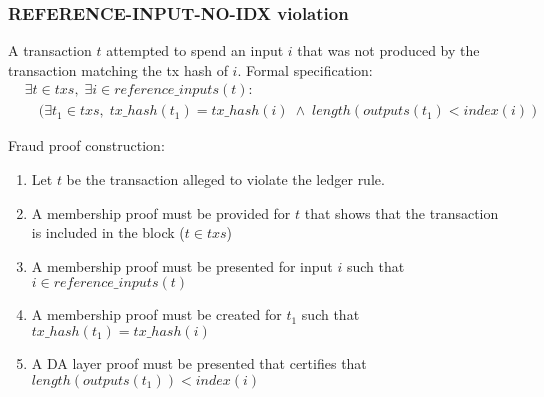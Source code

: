 \documentclass[../midgard.tex]{subfiles}
\begin{document}
\subsubsection{REFERENCE-INPUT-NO-IDX violation}
\label{violation:REFERENCE-INPUT-NO-IDX}
A transaction $t$ attempted to spend an input $i$ that was not produced by the transaction matching the tx hash of $i$.
Formal specification:
\begin{equation*}
\begin{split}
  &\exists t \in txs,\; \exists i \in reference\_inputs(t): \\
    &\quad( \exists t_1 \in txs,\;
      tx\_hash(t_1) = tx\_hash(i) \;\land\;
      length(outputs(t_1) <  index(i) )
\end{split}
\end{equation*}

Fraud proof construction:
\begin{enumerate}
  \item Let $t$ be the transaction alleged to violate the ledger rule. 
  \item A membership proof must be provided for $t$ that shows that the transaction is included in the block ($t \in txs$)
  \item A membership proof must be presented for input $i$ such that $i \in reference\_inputs(t)$
  \item A membership proof must be created for $t_1$ such that $tx\_hash(t_1) = tx\_hash(i)$
  \item A DA layer proof must be presented that certifies that $length(outputs(t_1)) < index(i)$
\end{enumerate}
\end{document}
